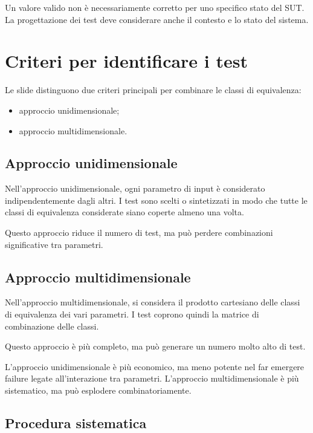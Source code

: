 \begin{notaesame}
Un valore valido non è necessariamente corretto per uno specifico stato del SUT. La progettazione dei test deve considerare anche il contesto e lo stato del sistema.
\end{notaesame}

\section{Criteri per identificare i test}

Le slide distinguono due criteri principali per combinare le classi di equivalenza:

\begin{itemize}
    \item approccio unidimensionale;
    \item approccio multidimensionale.
\end{itemize}

\subsection{Approccio unidimensionale}

Nell'approccio unidimensionale, ogni parametro di input è considerato indipendentemente dagli altri. I test sono scelti o sintetizzati in modo che tutte le classi di equivalenza considerate siano coperte almeno una volta.

Questo approccio riduce il numero di test, ma può perdere combinazioni significative tra parametri.

\subsection{Approccio multidimensionale}

Nell'approccio multidimensionale, si considera il prodotto cartesiano delle classi di equivalenza dei vari parametri. I test coprono quindi la matrice di combinazione delle classi.

Questo approccio è più completo, ma può generare un numero molto alto di test.

\begin{notaesame}
L'approccio unidimensionale è più economico, ma meno potente nel far emergere failure legate all'interazione tra parametri. L'approccio multidimensionale è più sistematico, ma può esplodere combinatoriamente.
\end{notaesame}

\subsection{Procedura sistematica}

